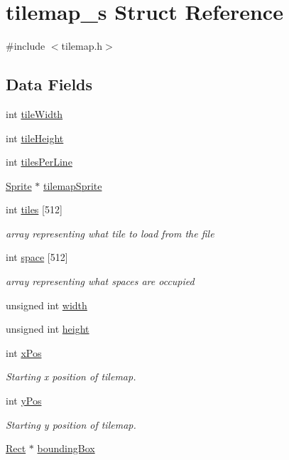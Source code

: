 \hypertarget{structtilemap__s}{}\section{tilemap\+\_\+s Struct Reference}
\label{structtilemap__s}


{\ttfamily \#include $<$tilemap.\+h$>$}

\subsection*{Data Fields}
\begin{DoxyCompactItemize}
\item 
int \hyperlink{structtilemap__s_a0d7dc92d8c4e78c59e24c48955ebb865}{tile\+Width}
\item 
int \hyperlink{structtilemap__s_ad05ab353f9f72c1ae3e30cf7f962c6ef}{tile\+Height}
\item 
int \hyperlink{structtilemap__s_a718cfcaa17c0fe278febb382e9e5469c}{tiles\+Per\+Line}
\item 
\hyperlink{gf2d__sprite_8h_a85b5a622f08c587d1f33fd504a24416e}{Sprite} $\ast$ \hyperlink{structtilemap__s_a98ed29ccb33f20a9d2784d8e18e9944c}{tilemap\+Sprite}
\item 
int \hyperlink{structtilemap__s_a0d1eb4f410c73be99ca705d6c88032bb}{tiles} \mbox{[}512\mbox{]}
\begin{DoxyCompactList}\small\item\em array representing what tile to load from the file \end{DoxyCompactList}\item 
int \hyperlink{structtilemap__s_a1bd608d2e076f47094fd2544223e7ddd}{space} \mbox{[}512\mbox{]}
\begin{DoxyCompactList}\small\item\em array representing what spaces are occupied \end{DoxyCompactList}\item 
unsigned int \hyperlink{structtilemap__s_aca34d28e3d8bcbcadb8edb4e3af24f8c}{width}
\item 
unsigned int \hyperlink{structtilemap__s_ab2e78c61905b4419fcc7b4cfc500fe85}{height}
\item 
int \hyperlink{structtilemap__s_a6806e78862b165988ca9b855e230084e}{x\+Pos}
\begin{DoxyCompactList}\small\item\em Starting x position of tilemap. \end{DoxyCompactList}\item 
int \hyperlink{structtilemap__s_adbae1d6f68d046bbecaa7230baf64762}{y\+Pos}
\begin{DoxyCompactList}\small\item\em Starting y position of tilemap. \end{DoxyCompactList}\item 
\hyperlink{shape_8h_a44e2d24ab2a21b90d03880cab9cc6d16}{Rect} $\ast$ \hyperlink{structtilemap__s_a3d49780e142d5f067cdd71be48ad284d}{bounding\+Box}
\end{DoxyCompactItemize}


